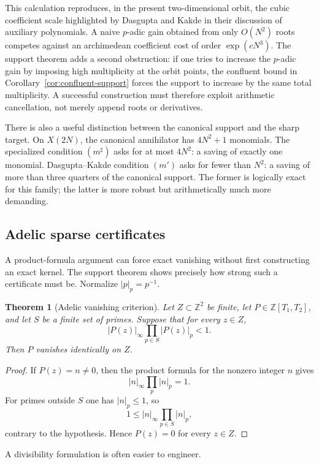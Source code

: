 \documentclass[11pt,oneside]{article}
\newtheorem{theorem}{Theorem}[section]
\theoremstyle{definition}
\theoremstyle{remark}
\newcommand{\Z}{\mathbb Z}
\begin{document}
This calculation reproduces, in the present two-dimensional orbit, the cubic coefficient
scale highlighted by Dasgupta and Kakde in their discussion of auxiliary polynomials.  A
naive $p$-adic gain obtained from only $O(N^2)$ roots competes against an archimedean
coefficient cost of order $\exp(cN^3)$.  The support theorem adds a second obstruction: if one
tries to increase the $p$-adic gain by imposing high multiplicity at the orbit points, the
confluent bound in Corollary~\ref{cor:confluent-support} forces the support to increase by the
same total multiplicity.  A successful construction must therefore exploit arithmetic
cancellation, not merely append roots or derivatives.

There is also a useful distinction between the canonical support and the sharp target.  On
$X(2N)$, the canonical annihilator has $4N^2+1$ monomials.  The specialized condition
$(m^{\sharp})$ asks for at most $4N^2$: a saving of exactly one monomial.  Dasgupta--Kakde
condition $(m')$ asks for fewer than $N^2$: a saving of more than three quarters of the
canonical support.  The former is logically exact for this family; the latter is more robust
but arithmetically much more demanding.

\subsection{Adelic sparse certificates}
\label{sec:sparse-adelic}

A product-formula argument can force exact vanishing without first constructing an exact
kernel.  The support theorem shows precisely how strong such a certificate must be.
Normalize $|p|_p=p^{-1}$.

\begin{theorem}[Adelic vanishing criterion]
\label{thm:adelic-vanishing}
Let $Z\subset\Z^2$ be finite, let $P\in\Z[T_1,T_2]$, and let $S$ be a finite set of primes.
Suppose that for every $z\in Z$,
\[
  |P(z)|_\infty\prod_{p\in S}|P(z)|_p<1.
\]
Then $P$ vanishes identically on $Z$.
\end{theorem}

\begin{proof}
If $P(z)=n\ne0$, then the product formula for the nonzero integer $n$ gives
\[
  |n|_\infty\prod_p|n|_p=1.
\]
For primes outside $S$ one has $|n|_p\le1$, so
\[
  1\le |n|_\infty\prod_{p\in S}|n|_p,
\]
contrary to the hypothesis.  Hence $P(z)=0$ for every $z\in Z$.
\end{proof}

A divisibility formulation is often easier to engineer.
\end{document}
